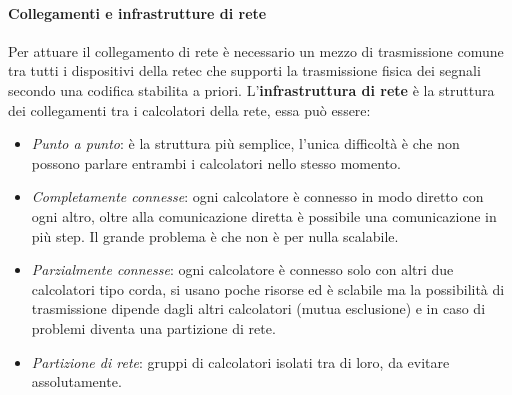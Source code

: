 \documentclass{article}
\begin{document}
\paragraph{Collegamenti e infrastrutture di rete}
Per attuare il collegamento di rete è necessario un mezzo di trasmissione
comune tra tutti i dispositivi della retec che supporti la trasmissione fisica
dei segnali secondo una codifica stabilita a priori. L'\textbf{infrastruttura
    di rete} è la struttura dei collegamenti tra i calcolatori della rete, essa può
essere:
\begin{itemize}
    \item \textit{Punto a punto}: è la struttura più semplice, l'unica difficoltà è che non possono parlare entrambi i calcolatori nello stesso momento.
    \item \textit{Completamente connesse}: ogni calcolatore è connesso in modo diretto con ogni altro, oltre alla comunicazione diretta è possibile una comunicazione in più step. Il grande problema è che non
          è per nulla scalabile.
    \item \textit{Parzialmente connesse}: ogni calcolatore è connesso solo con altri due calcolatori tipo corda, si usano poche risorse ed è sclabile ma la possibilità di trasmissione dipende dagli altri
          calcolatori (mutua esclusione) e in caso di problemi diventa una partizione di rete.
    \item \textit{Partizione di rete}: gruppi di calcolatori isolati tra di loro, da evitare assolutamente.
\end{itemize}
\end{document}
